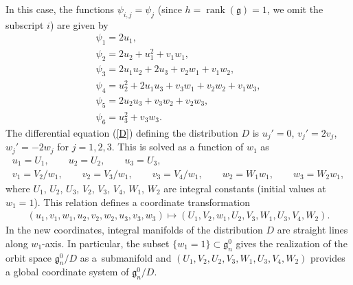 \documentclass[pdftex]{sigma}
\numberwithin{equation}{section}
\begin{document}
 In this case, the functions $\psi _{i,j} = \psi _j$ (since $h=\operatorname{rank}(\mathfrak{g}) = 1$, we omit the subscript $i$) are given by
\begin{gather*}
\psi _1 = 2u_1, \\
\psi _2 = 2u_2 + u_1^2 + v_1w_1, \\
\psi _3 = 2u_1u_2 + 2u_3 + v_2w_1 + v_1w_2,\\
\psi _4 = u_2^2 + 2u_1u_3 + v_3w_1 + v_2w_2 + v_1w_3, \\
\psi_5 = 2u_2u_3+v_3w_2+v_2w_3, \\
\psi_6 = u_3^2 + v_3w_3.
\end{gather*}
The dif\/ferential equation (\ref{D}) def\/ining the distribution $D$ is $u_j' = 0$, $ v_j' = 2v_j$, $ w_j' = -2w_j$ for $j=1,2,3$. This is solved as a function of $w_1$ as
\begin{gather*}
 u_1 = U_1, \qquad u_2 = U_2,\qquad u_3= U_3, \\
 v_1 = V_2/w_1,\qquad v_2 = V_3/w_1,\qquad v_3 = V_4/w_1,\qquad w_2 = W_1 w_1,\qquad w_3 = W_2w_1,
\end{gather*}
where $U_1$, $U_2$, $ U_3$, $V_2$, $V_3$, $V_4$, $W_1$, $W_2$ are integral constants (initial values at $w_1 = 1$). This relation def\/ines a coordinate transformation
\begin{gather*}
(u_1, v_1, w_1, u_2, v_2, w_2, u_3, v_3, w_3) \mapsto (U_1, V_2, w_1, U_2, V_3, W_1, U_3, V_4, W_2).
\end{gather*}
In the new coordinates, integral manifolds of the distribution $D$ are straight lines along $w_1$-axis. In particular, the subset $\{ w_1 = 1\} \subset \mathfrak{g}^0_n$ gives the realization of the orbit space $\mathfrak{g}^0_n/D$ as a~submanifold and $(U_1, V_2, U_2, V_3, W_1, U_3, V_4, W_2)$ provides a global coordinate system of $\mathfrak{g}^0_n/D$.
\end{document}
